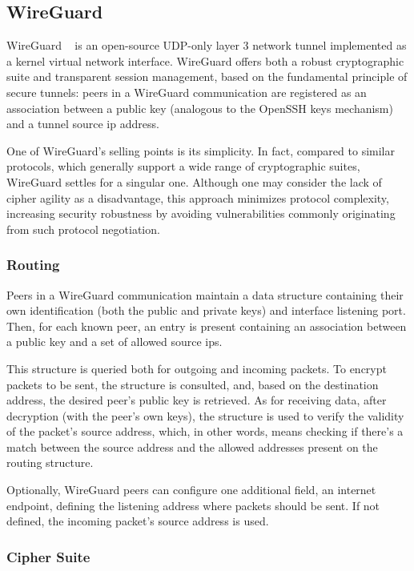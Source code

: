 \documentclass[11pt,twoside,a4paper]{report}
\begin{document}
\subsection{WireGuard}

WireGuard ~\cite{donenfeld2017wireguard} is an open-source UDP-only layer 3 network tunnel implemented as a kernel virtual network interface. WireGuard offers both a robust cryptographic suite and transparent session management, based on the fundamental principle of secure tunnels: peers in a WireGuard communication are registered as an association between a public key (analogous to the OpenSSH keys mechanism) and a tunnel source \ac{ip} address.

One of WireGuard's selling points is its simplicity. In fact, compared to similar protocols, which generally support a wide range of cryptographic suites, WireGuard settles for a singular one. Although one may consider the lack of cipher agility as a disadvantage, this approach minimizes protocol complexity, increasing security robustness by avoiding vulnerabilities commonly originating from such protocol negotiation.

\subsubsection{Routing}

Peers in a WireGuard communication maintain a data structure containing their own identification (both the public and private keys) and interface listening port. Then, for each known peer, an entry is present containing an association between a public key and a set of allowed source ips.

This structure is queried both for outgoing and incoming packets. To encrypt packets to be sent, the structure is consulted, and, based on the destination address, the desired peer's public key is retrieved. As for receiving data, after decryption (with the peer's own keys), the structure is used to verify the validity of the packet's source address, which, in other words, means checking if there's a match between the source address and the allowed addresses present on the routing structure.

Optionally, WireGuard peers can configure one additional field, an internet endpoint, defining the listening address where packets should be sent. If not defined, the incoming packet's source address is used.

\subsubsection{Cipher Suite}
\end{document}
